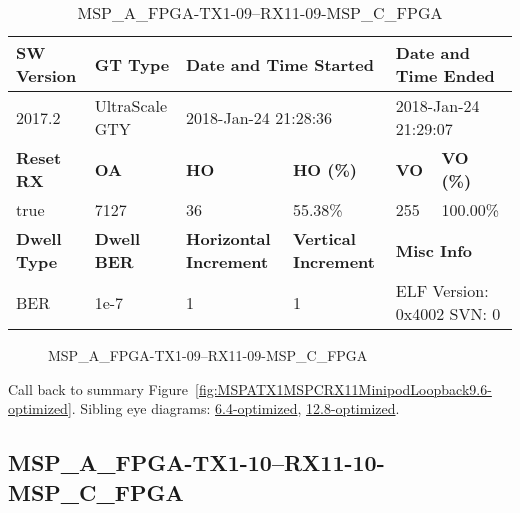 \begin{table}[h]
\centering
\caption{MSP\_A\_FPGA-TX1-09--RX11-09-MSP\_C\_FPGA}
\label{tab:MSPAFPGATX109RX1109MSPCFPGA9.6-optimized}
\begin{tabular}{@{}|l|l|l|l|l|l|@{}}
\toprule
\textbf{SW Version}                & \textbf{GT Type}   & \multicolumn{2}{l|}{\textbf{Date and Time Started}}            & \multicolumn{2}{l|}{\textbf{Date and Time Ended}}        \\ \midrule
2017.2                       & UltraScale GTY          & \multicolumn{2}{l|}{2018-Jan-24 21:28:36}                   & \multicolumn{2}{l|}{2018-Jan-24 21:29:07}               \\ \midrule
\textbf{Reset RX}                  & \textbf{OA} & \textbf{HO}   & \textbf{HO (\%)} & \textbf{VO} & \textbf{VO (\%)} \\ \midrule
true & 7127        & 36          & 55.38\%        & 255        & 100.00\%       \\ \midrule
\textbf{Dwell Type}                & \textbf{Dwell BER} & \textbf{Horizontal Increment} & \textbf{Vertical Increment}    & \multicolumn{2}{l|}{\textbf{Misc Info}}                  \\ \midrule
BER                            & 1e-7        & 1        & 1           & \multicolumn{2}{l|}{ELF Version: 0x4002 SVN: 0}                         \\ \bottomrule
\end{tabular}
\end{table}

\begin{figure}[h]
\caption{MSP\_A\_FPGA-TX1-09--RX11-09-MSP\_C\_FPGA} \label{fig:MSPAFPGATX109RX1109MSPCFPGA9.6-optimized}
\end{figure}

Call back to summary Figure~\ref{fig:MSPATX1MSPCRX11MinipodLoopback9.6-optimized}.
Sibling eye diagrams: \hyperref[sec:MSPAFPGATX109RX1109MSPCFPGA6.4-optimized]{6.4-optimized}, \hyperref[sec:MSPAFPGATX109RX1109MSPCFPGA12.8-optimized]{12.8-optimized}.

\clearpage
\newpage


\subsection{MSP\_A\_FPGA-TX1-10--RX11-10-MSP\_C\_FPGA}\label{sec:MSPAFPGATX110RX1110MSPCFPGA9.6-optimized}

